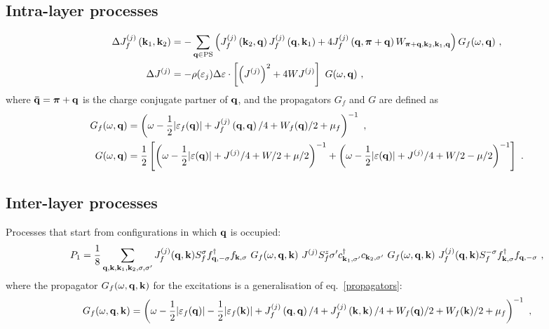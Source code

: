 \documentclass[%
reprint,
superscriptaddress,
groupedaddress,
superscriptaddress,
onecolumn,
]{revtex4-2}
\begin{document}
\subsection{Intra-layer processes}
\begin{equation}\begin{aligned}
	\Delta J_f^{(j)}\left({\bf k}_1, {\bf k}_2\right) &= -\sum_{{\bf q} \in \text{PS}} \left(J_f^{(j)}\left({\bf k}_2,{\bf q}\right) J_f^{(j)}\left({\bf q},{\bf k}_1\right) + 4J_f^{(j)}\left({\bf q}, {\boldsymbol \pi} + {\bf q}\right) W_{{\boldsymbol \pi} + {\bf q}, {\bf k}_2, {\bf k}_1, {\bf q}}\right) G_f(\omega, {\bf q})~,\\
	\Delta J^{(j)} &= - \rho(\varepsilon_j)\Delta \varepsilon\cdot\left[\left(J^{(j)}\right)^2 + 4WJ^{(j)}\right]~G(\omega, {\bf q})~,
\end{aligned}\end{equation}
where \({\bf \bar q} = {\boldsymbol \pi} + {\bf q}\) is the charge conjugate partner of \({\bf q}\), and the propagators \(G_f\) and \(G\) are defined as
\begin{equation}\begin{aligned}\label{propagators}
	G_f(\omega,{\bf q}) &= \left(\omega - \frac{1}{2}|\varepsilon_f({\bf q})| + J^{(j)}_f\left({\bf q},{\bf q}\right)/4 + W_f({\bf q})/2 + \mu_f\right)^{-1} ~,\\
	G(\omega,{\bf q}) &= \frac{1}{2}\left[\left(\omega - \frac{1}{2}|\varepsilon({\bf q})| + J^{(j)}/4 + W/2 + \mu/2\right)^{-1} + \left(\omega - \frac{1}{2}|\varepsilon({\bf q})| + J^{(j)}/4 + W/2 - \mu/2\right)^{-1}\right] ~.
\end{aligned}\end{equation}


\subsection{Inter-layer processes}
Processes that start from configurations in which \({\bf q}\) is occupied:
\begin{equation}\begin{aligned}
	P_1 = \frac{1}{8}\sum_{{\bf q},{\bf k},{\bf k}_1, {\bf k}_2,\sigma,\sigma^\prime} J_f^{(j)}({\bf q},{\bf k}) S_f^\sigma f^\dagger_{{\bf q},-\sigma}f_{{\bf k},\sigma} ~ G_f(\omega, {\bf q}, {\bf k}) ~ J^{(j)} S_f^z \sigma^\prime c^\dagger_{{\bf k}_1,\sigma^\prime}c_{{\bf k}_2,\sigma^\prime} ~ G_f(\omega, {\bf q}, {\bf k}) ~ J_f^{(j)}({\bf q},{\bf k}) S_f^{-\sigma} f^\dagger_{{\bf k},\sigma}f_{{\bf q},-\sigma}~,
\end{aligned}\end{equation}
where the propagator \(G_f(\omega, {\bf q}, {\bf k})\) for the excitations is a generalisation of eq.~\ref{propagators}:
\begin{equation}\begin{aligned}
	G_f(\omega, {\bf q}, {\bf k}) &= \left(\omega - \frac{1}{2}|\varepsilon_f({\bf q})| - \frac{1}{2}|\varepsilon_f({\bf k})| + J^{(j)}_f\left({\bf q},{\bf q}\right)/4 + J^{(j)}_f\left({\bf k},{\bf k}\right)/4 + W_f({\bf q})/2 + W_f({\bf k})/2 + \mu_f\right)^{-1} ~,\\
\end{aligned}\end{equation}
\end{document}
